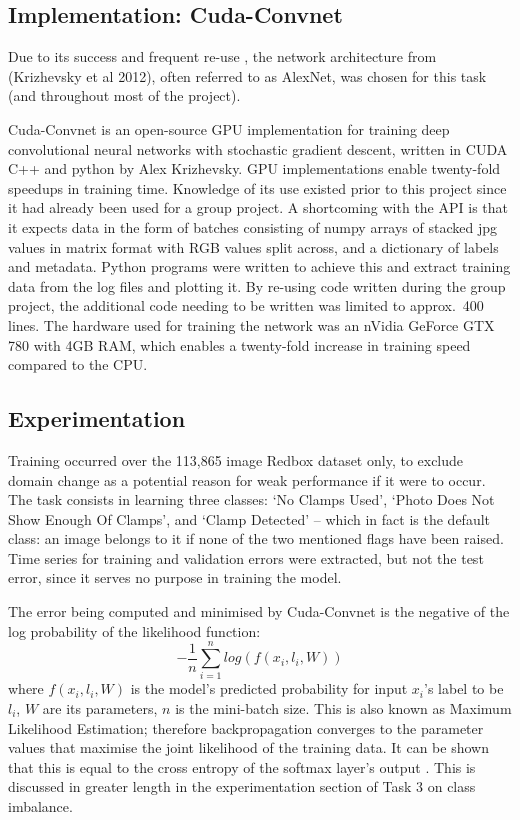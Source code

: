 \documentclass[a4paper,11pt]{article}
\begin{document}
\subsection{Implementation: Cuda-Convnet}

Due to its success and frequent re-use \cite{rectifier} \cite{goodfellow_street_view} \cite{decaf} \cite{fergus_tutorial} \cite{colah} \cite{zeiler_fergus} \cite{transfer-learning} \cite{caffe-website}, the network architecture from (Krizhevsky et al 2012), often referred to as AlexNet, was chosen for this task (and throughout most of the project).

Cuda-Convnet is an open-source GPU implementation for training deep convolutional neural networks with stochastic gradient descent, written in CUDA C++ and python by Alex Krizhevsky. GPU implementations enable twenty-fold speedups\cite{soumith-benchmark} in training time. Knowledge of its use existed prior to this project since it had already been used for a group project. A shortcoming with the API is that it expects data in the form of batches consisting of numpy arrays of stacked jpg values in matrix format with RGB values split across, and a dictionary of labels and metadata. Python programs were written to achieve this and extract training data from the log files and plotting it. By re-using code written during the group project, the additional code needing to be written was limited to approx.\ 400 lines. The hardware used for training the network was an nVidia GeForce GTX 780 with 4GB RAM, which enables a twenty-fold increase in training speed compared to the CPU. 

\subsection{Experimentation}

Training occurred over the 113,865 image Redbox dataset only, to exclude domain change as a potential reason for weak performance if it were to occur. The task consists in learning three classes: `No Clamps Used', `Photo Does Not Show Enough Of Clamps', and `Clamp Detected' -- which in fact is the default class: an image belongs to it if none of the two mentioned flags have been raised. Time series for training and validation errors were extracted, but not the test error, since it serves no purpose in training the model. 

The error being computed and minimised by Cuda-Convnet is the negative of the log probability of the likelihood function:
\begin{equation}
-\frac{1}{n}\sum\limits_{i=1}^{n} log(f(x_i,l_i,W))
\end{equation}
where $f(x_i,l_i,W)$ is the model's predicted probability for input $x_i$'s label to be $l_i$, $W$ are its parameters, $n$ is the mini-batch size. This is also known as Maximum Likelihood Estimation; therefore backpropagation converges to the parameter values that maximise the joint likelihood of the training data. It can be shown that this is equal to the cross entropy of the softmax layer's output \cite{DL-book}. This is discussed in greater length in the experimentation section of Task 3 on class imbalance. 
\end{document}
